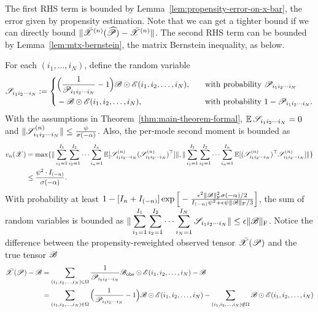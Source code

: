 \documentclass{article}
\newcommand{\T}[2][]{#1\mathscr{\MakeUppercase{#2}}}
\newcommand{\Expect}{\operatorname{\mathbb{E}}}
\newcommand{\norm}[1]{\Vert #1 \Vert}
\newcommand{\fnorm}[1]{\norm{#1}_{\mathrm{F}}}
\def\Ph{\widehat P}
\theoremstyle{plain}
\begin{document}
The first RHS term is bounded by Lemma~\ref{lem:propensity-error-on-x-bar}, the error given by propensity estimation.
Note that we can get a tighter bound if we can directly bound $\norm{\bar{\T{X}}^{(n)}(\T{\Ph}) - \bar{\T{X}}^{(n)}}$. The second RHS term can be bounded by Lemma~\ref{lem:mtx-bernstein}, the matrix Bernstein inequality, as below.

For each $(i_1, \dots, i_N)$, define the random variable
\begin{equation}
	\T{S}_{i_1 i_2 \cdots i_N} := \left\{
	\begin{aligned}
		& \Big(\frac{1}{\T{P}_{i_1 i_2 \cdots i_N}} - 1 \Big) \T{B} \odot \T{E}(i_1, i_2, \dots, i_N), \quad && \text{with probability $\T{P}_{i_1 i_2 \cdots i_N}$} \\
		& - \T{B} \odot \T{E}(i_1, i_2, \dots, i_N), \quad && \text{with probability $1-\T{P}_{i_1 i_2 \cdots i_N}$.}
	\end{aligned}
	\right.
	\nonumber
\end{equation}
With the assumptions in Theorem~\ref{thm:main-theorem-formal}, $\Expect \T{S}_{i_1 i_2 \cdots i_N} = 0$ and $\norm{\T{S}_{i_1 i_2 \cdots i_N}^{(n)}} \leq \frac{\psi}{\sigma (- \alpha)}$. 
Also, the per-mode second moment is bounded as
\begin{equation}
	\begin{aligned}
		v_n(\T{X}) & = \max\{\norm{\sum_{i_1=1}^{I_1} \sum_{i_2=1}^{I_2} \cdots \sum_{i_n=1}^{I_n} \Expect[\T{S}_{i_1 i_2 \cdots i_N}^{(n)} (\T{S}_{i_1 i_2 \cdots i_N}^{(n)})^\top] }, \norm{\sum_{i_1=1}^{I_1} \sum_{i_2=1}^{I_2} \cdots \sum_{i_n=1}^{I_n} \Expect[(\T{S}_{i_1 i_2 \cdots i_N}^{(n)})^\top \T{S}_{i_1 i_2 \cdots i_N}^{(n)}]} \} \\
		& \leq \frac{\psi^2 \cdot I_{(-n)}}{\sigma (- \alpha)}.
	\end{aligned}
	\nonumber
\end{equation}
With probability at least $1 - [I_n + I_{(-n)}] \exp \Big[- \frac{\epsilon^2 \fnorm{\T{B}}^2 \sigma(- \alpha)/ 2}{I_{(-n)} \psi^2 + \epsilon \psi \fnorm{\T{B}}/3}\Big]$, the sum of random variables is bounded as $\displaystyle \norm{ \sum_{i_1=1}^{I_1} \sum_{i_2=1}^{I_2} \cdots \sum_{i_N=1}^{I_N} \T{S}_{i_1 i_2 \cdots i_N} } \leq \epsilon \fnorm{\T{B}}$.
Notice the difference between the propensity-reweighted observed tensor $\bar{\T{X}}(\T{P})$ and the true tensor $\T{B}$ 
\begin{equation}
	\begin{aligned}
	\bar{\T{X}} (\T{P}) - \T{B} & = \sum_{(i_1, i_2, \dots, i_N) \in \Omega} \frac{1}{\T{P}_{i_1 i_2 \cdots i_N}} \T{B}_\text{obs} \odot \T{E}(i_1, i_2, \dots, i_N) - \T{B} \\
	& = \sum_{(i_1, i_2, \dots, i_N) \in \Omega} \Big(\frac{1}{\T{P}_{i_1 i_2 \cdots i_N}} - 1 \Big) \T{B} \odot \T{E}(i_1, i_2, \dots, i_N) - \sum_{(i_1, i_2, \dots, i_N) \notin \Omega}  \T{B} \odot \T{E}(i_1, i_2, \dots, i_N)\\
	\end{aligned}
	\nonumber
\end{equation}
\end{document}
